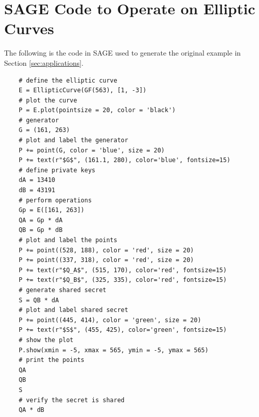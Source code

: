 \documentclass[]{math_paper}
\begin{document}
\section{SAGE Code to Operate on Elliptic Curves}
\label{sec:code}
The following is the code in SAGE used to generate the original example in Section \ref{sec:applications}.
\begin{lstlisting}
    # define the elliptic curve
    E = EllipticCurve(GF(563), [1, -3])
    # plot the curve
    P = E.plot(pointsize = 20, color = 'black')
    # generator
    G = (161, 263)
    # plot and label the generator
    P += point(G, color = 'blue', size = 20)
    P += text(r"$G$", (161.1, 280), color='blue', fontsize=15)
    # define private keys 
    dA = 13410
    dB = 43191
    # perform operations
    Gp = E([161, 263]) 
    QA = Gp * dA
    QB = Gp * dB
    # plot and label the points
    P += point((528, 188), color = 'red', size = 20)
    P += point((337, 318), color = 'red', size = 20)
    P += text(r"$Q_A$", (515, 170), color='red', fontsize=15)
    P += text(r"$Q_B$", (325, 335), color='red', fontsize=15)
    # generate shared secret
    S = QB * dA
    # plot and label shared secret
    P += point((445, 414), color = 'green', size = 20)
    P += text(r"$S$", (455, 425), color='green', fontsize=15)
    # show the plot
    P.show(xmin = -5, xmax = 565, ymin = -5, ymax = 565)
    # print the points 
    QA
    QB
    S
    # verify the secret is shared 
    QA * dB
\end{lstlisting}
\end{document}
